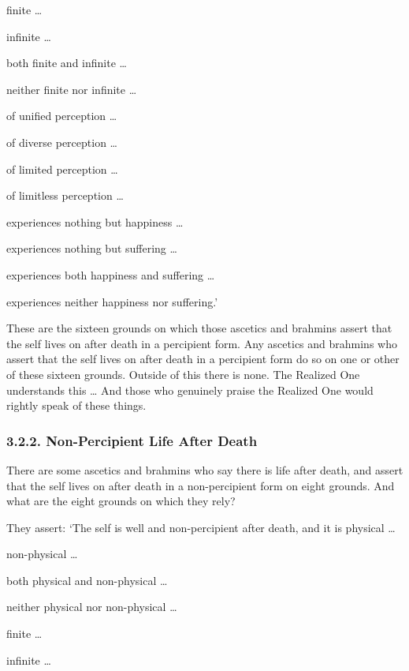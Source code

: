 \documentclass[12pt,openany]{book}%
\begin{document}
finite … 

infinite … 

both finite and infinite … 

neither finite nor infinite … 

of unified perception … 

of diverse perception … 

of limited perception … 

of limitless perception … 

experiences nothing but happiness … 

experiences nothing but suffering … 

experiences both happiness and suffering … 

experiences neither happiness nor suffering.’ 

These are the sixteen grounds on which those ascetics and brahmins assert that the self lives on after death in a percipient form. Any ascetics and brahmins who assert that the self lives on after death in a percipient form do so on one or other of these sixteen grounds. Outside of this there is none. The Realized One understands this … And those who genuinely praise the Realized One would rightly speak of these things. 

\subsubsection*{3.2.2. Non-Percipient Life After Death }

There are some ascetics and brahmins who say there is life after death, and assert that the self lives on after death in a non-percipient form on eight grounds. And what are the eight grounds on which they rely? 

They assert: ‘The self is well and non-percipient after death, and it is physical … 

non-physical … 

both physical and non-physical … 

neither physical nor non-physical … 

finite … 

infinite … 
\end{document}
